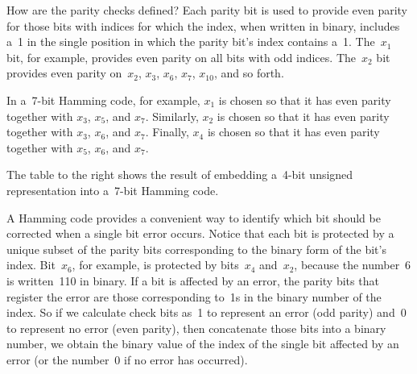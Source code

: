 How are the parity checks defined?  Each parity bit is used to
provide even parity for those bits with indices for which the index,
when written in binary, includes a~1 in the single position in which
the parity bit's index contains a~1.  The~$x_1$ bit, for example,
provides even parity on all bits with odd indices.  The~$x_2$ bit
provides even parity on~$x_2$, $x_3$, $x_6$, $x_7$, $x_{10}$, and so
forth.

In a~\mbox{7-bit} Hamming code, for example, 
$x_1$ is chosen so that
it has even parity together with $x_3$, $x_5$, and $x_7$.
%
Similarly, $x_2$ is chosen so that
it has even parity together with $x_3$, $x_6$, and $x_7$.
%
Finally, $x_4$ is chosen so that
it has even parity together with $x_5$, $x_6$, and $x_7$.

\begin{minipage}{2.85in}
The table to the right shows the result of embedding 
a~\mbox{4-bit} unsigned representation into a~\mbox{7-bit}
Hamming code.\mpline

A Hamming code provides a convenient way to identify
which bit should be corrected when a single bit error occurs.  
Notice that each bit is protected by a unique subset of the parity bits
corresponding to the binary form of the bit's index.  Bit~$x_6$, for
example, is protected by bits~$x_4$ and~$x_2$, because the number~6
is written~110 in binary.
If a bit is affected by an error, the parity bits
that register the error are those corresponding to~1s in the binary
number of the index.  So if we calculate check bits as~1 to represent
an error (odd parity) and~0 to represent no error (even parity),
then concatenate those bits into a binary number, we obtain the
binary value of the index of the single bit affected by an error (or 
the number~0
if no error has occurred).
\end{minipage}\hspace{.25in}%
